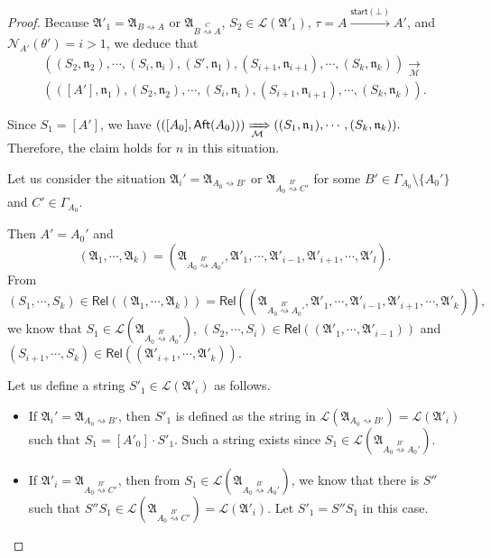 \documentclass[preprint,12pt]{elsarticle}
\newcommand\Mm{{\mathcal{M} }}
\newcommand\aft{{\sf Aft}}
\newcommand\startactivity{{\mathsf{start} }}
\newcommand\namefun{\mathcal{N}}
\newcommand\aname{\mathfrak{n}}
\newcommand\Rel{\mathsf{Rel}}
\newcommand\Aut{{\mathfrak{A} }}
\newcommand\Lang{{\mathscr{L} }}
\begin{document}
\begin{proof}
Because $\Aut'_1 = \Aut_{B \rightsquigarrow A}$ or $\Aut_{B \stackrel{C}{\rightsquigarrow} A}$, $S_2 \in \Lang(\Aut'_1)$,  $\tau = A \xrightarrow{\startactivity(\bot)} A'$, and $\namefun_{A'}(\theta') = i > 1$, 
we deduce that 
$$
\begin{array}{l}
((S_2, \aname_2), \cdots, (S_i, \aname_i), (S', \aname_1), (S_{i+1}, \aname_{i+1}), \cdots, (S_k, \aname_k)) \xrightarrow[\Mm]{} \\
(([A'], \aname_1), (S_2, \aname_2), \cdots, (S_i, \aname_i), (S_{i+1}, \aname_{i+1}), \cdots, (S_k, \aname_k)).
\end{array}
$$ 

Since $S_1 = [A']$, we have
$(([A_0], \aft(A_0))) \xRightarrow[\Mm]{} ((S_1, \aname_1), \cdots, (S_k, \aname_k)).$
%
Therefore, the claim holds for $n$ in this situation.


Let us consider the situation $\Aut_i' = \Aut_{A_0 \rightsquigarrow B'}$ or $\Aut_{A_0 \stackrel{B'}{\rightsquigarrow} C'}$ for some $B' \in\Gamma_{A_0}\setminus\{A_0'\}$ and $C' \in \Gamma_{A_0}$. 

Then $A' = A_0'$ and
$$(\Aut_1, \cdots, \Aut_k) = (\Aut_{A_0\stackrel{B'}{\rightsquigarrow} A_0'}, \Aut'_1, \cdots, \Aut'_{i-1}, \Aut'_{i+1}, \cdots, \Aut'_l).$$ 
From 
%
$$(S_1, \cdots, S_k) \in \Rel((\Aut_1, \cdots, \Aut_k)) = \Rel((\Aut_{A_0\stackrel{B'}{\rightsquigarrow} A_0'}, \Aut'_1, \cdots, \Aut'_{i-1}, \Aut'_{i+1}, \cdots, \Aut'_k)),$$ 
we know that $S_1 \in \Lang(\Aut_{A_0\stackrel{B'}{\rightsquigarrow} A_0'})$, $(S_2, \cdots, S_{i}) \in \Rel((\Aut'_1, \cdots, \Aut'_{i-1}))$ and $(S_{i+1}, \cdots, S_k) \in \Rel((\Aut'_{i+1}, \cdots, \Aut'_k))$. 

Let us define a string $S'_1 \in \Lang(\Aut'_i)$ as follows. 
\begin{itemize} 
\item If $\Aut_i' = \Aut_{A_0 \rightsquigarrow B'}$, then $S'_1$ is defined as the string in $\Lang(\Aut_{A_0 \rightsquigarrow B'})  = \Lang(\Aut'_i)$ such that $S_1 = [A'_0] \cdot S'_1$.  Such a string exists since $S_1 \in \Lang(\Aut_{A_0\stackrel{B'}{\rightsquigarrow} A_0'})$. 
%
\item If $\Aut'_i = \Aut_{A_0 \stackrel{B'}{\rightsquigarrow} C'}$, then from $S_1 \in \Lang(\Aut_{A_0\stackrel{B'}{\rightsquigarrow} A_0'})$, we know that there is $S''$ such that $S'' S_1 \in \Lang(\Aut_{A_0 \stackrel{B'}{\rightsquigarrow} C'}) = \Lang(\Aut'_i)$. Let $S'_1 = S''S_1$ in this case. 
\end{itemize}


\end{proof}
\end{document}
